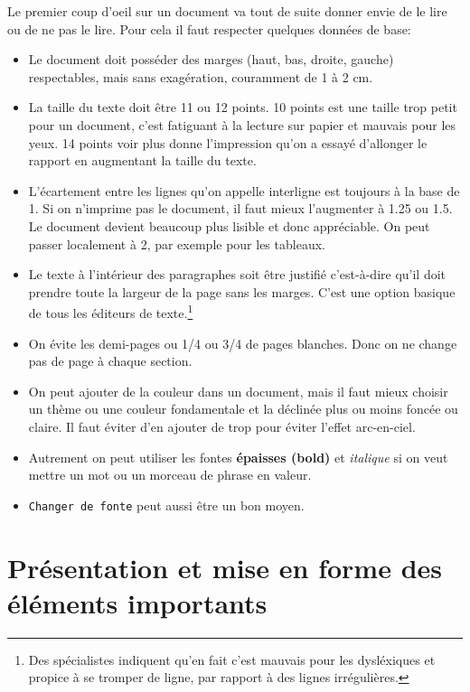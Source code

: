 Le premier coup d'oeil sur un document va tout de suite donner envie de le lire ou 
de ne pas le lire. Pour cela il faut respecter quelques données de base:
\begin{itemize}
\item Le document doit posséder des marges (haut, bas, droite, gauche) respectables, mais sans exagération, couramment de 1 à 2 cm.

\item La taille du texte doit être 11 ou 12 points. 
10 points est une taille trop petit pour un document, c'est fatiguant à la lecture sur papier et mauvais pour les yeux. 14 points voir plus donne l'impression qu'on a essayé  d'allonger le rapport en augmentant la taille du texte.

\item L'écartement entre les lignes qu'on appelle interligne est toujours à la base de 1. Si on n'imprime pas le document, il faut mieux l'augmenter à 1.25 ou 1.5. Le document devient beaucoup plus lisible et donc appréciable. On peut passer localement à 2, par exemple pour les tableaux.

\item Le texte à l'intérieur des paragraphes soit être justifié c'est-à-dire qu'il doit prendre toute la largeur de la page sans les marges.
 C'est une option basique de tous les éditeurs de texte.\footnote{Des spécialistes indiquent qu'en fait c'est mauvais pour les dysléxiques et propice à se tromper de ligne, par rapport à des lignes irrégulières.}
 
\item On évite les demi-pages ou 1/4 ou 3/4 de pages blanches. Donc on ne change pas de page à chaque section.

\item On peut ajouter de la couleur dans un document, mais il faut mieux choisir un thème ou une couleur fondamentale et la déclinée plus ou moins foncée ou claire. Il faut éviter d'en ajouter de trop pour éviter l'effet arc-en-ciel.

\item Autrement on peut utiliser les fontes \textbf{épaisses (bold)} et \textit{italique} si on veut mettre un mot ou un morceau de phrase en valeur.

\item \texttt{Changer de fonte} peut aussi être un bon moyen.
\end{itemize}

\section{Présentation et mise en forme des éléments importants}  

